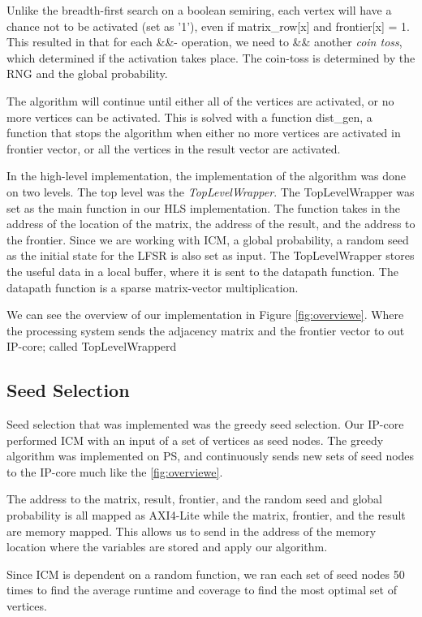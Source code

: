 Unlike the breadth-first search on a boolean semiring, each vertex will have a chance not to be activated (set as '1'), even if matrix\_row[x] and frontier[x] = 1. This resulted in that for each \&\&- operation, we need to \&\& another \textit{coin toss}, which determined if the activation takes place. The coin-toss is determined by the RNG and the global probability. 

The algorithm will continue until either all of the vertices are activated, or no more vertices can be activated. This is solved with a function dist\_gen, a function that stops the algorithm when either no more vertices are activated in frontier vector, or all the vertices in the result vector are activated. 

In the high-level implementation, the implementation of the algorithm was done on two levels. The top level was the \textit{TopLevelWrapper}. The TopLevelWrapper was set as the main function in our HLS implementation. The function takes in the address of the location of the matrix, the address of the result, and the address to the frontier. Since we are working with ICM, a global probability, a random seed as the initial state for the LFSR is also set as input. The  TopLevelWrapper stores the useful data in a local buffer, where it is sent to the datapath function. The datapath function is a sparse matrix-vector multiplication. 

We can see the overview of our implementation in Figure \ref{fig:overviewe}. Where the processing system sends the adjacency matrix and the frontier vector to out IP-core; called TopLevelWrapperd

\subsection{Seed Selection}
Seed selection that was implemented was the greedy seed selection. Our IP-core performed ICM with an input of a set of vertices as seed nodes. The greedy algorithm was implemented on PS, and continuously sends new sets of seed nodes to the IP-core much like the \ref{fig:overviewe}. 

The address to the matrix, result, frontier, and the random seed and global probability is all mapped as AXI4-Lite while the matrix, frontier, and the result are memory mapped. This allows us to send in the address of the memory location where the variables are stored and apply our algorithm. 
 
Since ICM is dependent on a random function, we ran each set of seed nodes 50 times to find the average runtime and coverage to find the most optimal set of vertices.

